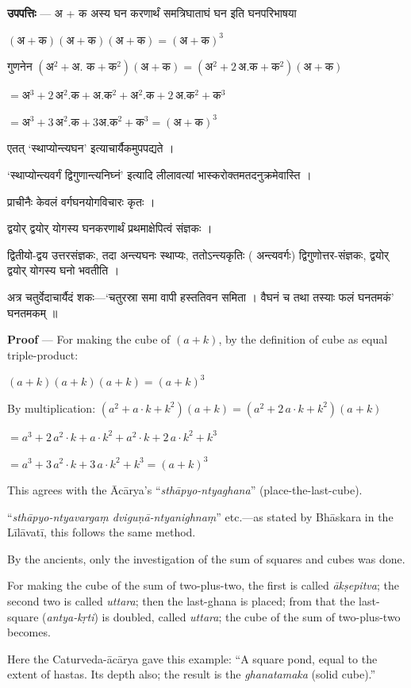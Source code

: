 \documentclass[11pt,a4paper]{article}
\newcommand{\skt}[1]{{\devanagarifont\color{sktcolor} #1}}
\newenvironment{bilingual}{%
  \par\noindent
  \begin{minipage}[t]{0.47\textwidth}%
}{%
  \par\end{minipage}%
}
\newcommand{\rightcol}{%
  \par\end{minipage}%
  \hfill
  \begin{minipage}[t]{0.47\textwidth}%
}
\begin{document}
\begin{bilingual}
\textbf{उपपत्तिः} --- \skt{अ + क अस्य घन करणार्थं समत्रिघाताघं घन इति घनपरिभाषया}

$(\text{अ} + \text{क})(\text{अ} + \text{क})(\text{अ} + \text{क}) = (\text{अ} + \text{क})^3$

\skt{गुणनेन} $(\text{अ}^2 + \text{अ. क} + \text{क}^2)(\text{अ} + \text{क}) = (\text{अ}^2 + 2\,\text{अ.क} + \text{क}^2)(\text{अ} + \text{क})$

$= \text{अ}^3 + 2\,\text{अ}^2.\text{क} + \text{अ.क}^2 + \text{अ}^2.\text{क} + 2\,\text{अ.क}^2 + \text{क}^3$

$= \text{अ}^3 + 3\,\text{अ}^2.\text{क} + 3\text{अ.क}^2 + \text{क}^3 = (\text{अ} + \text{क})^3$

\skt{एतत् `स्थाप्योन्त्यघन' इत्याचार्यैकमुपपद्यते} ।

\skt{`स्थाप्योन्त्यवर्गं द्विगुणान्त्यनिघ्नं' इत्यादि लीलावत्यां भास्करोक्तमतदनुक्रमेवास्ति} ।

\skt{प्राचीनैः केवलं वर्गघनयोगविचारः कृतः} ।

\skt{द्वयोर् द्वयोर् योगस्य घनकरणार्थं प्रथमाक्षेपित्वं संज्ञकः} ।

\skt{द्वितीयो-द्वय उत्तरसंज्ञकः, तदा अन्त्यघनः स्थाप्यः, ततोऽन्त्यकृतिः} (\skt{अन्त्यवर्गः}) \skt{द्विगुणोत्तर-संज्ञकः, द्वयोर् द्वयोर् योगस्य घनो भवतीति} ।

\skt{अत्र चतुर्वेदाचार्यैदं शकः---`चतुरस्रा समा वापी हस्ततिवन समिता । वैघनं च तथा तस्याः फलं घनतमकं' घनतमकम्} ॥
\rightcol
\textbf{Proof} --- For making the cube of $(a + k)$, by the definition of cube as equal triple-product:

$(a + k)(a + k)(a + k) = (a + k)^3$

By multiplication: $(a^2 + a \cdot k + k^2)(a + k) = (a^2 + 2\,a \cdot k + k^2)(a + k)$

$= a^3 + 2\,a^2 \cdot k + a \cdot k^2 + a^2 \cdot k + 2\,a \cdot k^2 + k^3$

$= a^3 + 3\,a^2 \cdot k + 3\,a \cdot k^2 + k^3 = (a + k)^3$

This agrees with the Ācārya's ``\textit{sthāpyo-ntyaghana}'' (place-the-last-cube).

``\textit{sthāpyo-ntyavargaṃ dviguṇā-ntyanighnaṃ}'' etc.---as stated by Bhāskara in the Līlāvatī, this follows the same method.

By the ancients, only the investigation of the sum of squares and cubes was done.

For making the cube of the sum of two-plus-two, the first is called \textit{ākṣepitva}; the second two is called \textit{uttara}; then the last-ghana is placed; from that the last-square (\textit{antya-kṛti}) is doubled, called \textit{uttara}; the cube of the sum of two-plus-two becomes.

Here the Caturveda-ācārya gave this example: ``A square pond, equal to the extent of hastas. Its depth also; the result is the \textit{ghanatamaka} (solid cube).''
\end{bilingual}
\end{document}
